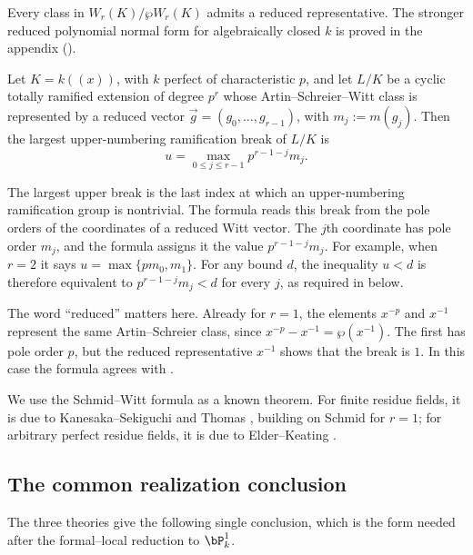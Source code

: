 Every class in $W_r(K)/\wp W_r(K)$ admits a reduced representative.
The stronger reduced polynomial normal form for algebraically closed $k$ is
proved in the appendix ().

\begin{theorem}
\label{theorem:schmid_witt_break_formula}
Let $K=k((x))$, with $k$ perfect of characteristic $p$, and let $L/K$ be a
cyclic totally ramified extension of degree $p^r$ whose
Artin--Schreier--Witt class is represented by a reduced vector
$\vec g=(g_0,\dots,g_{r-1})$, with $m_j:=m(g_j)$. Then the largest
upper-numbering ramification break of $L/K$ is
\[
u=\max_{0\leq j\leq r-1}p^{r-1-j}m_j.
\]
\end{theorem}

The largest upper break is the last index at which an upper-numbering
ramification group is nontrivial. The formula reads this break from the pole
orders of the coordinates of a reduced Witt vector. The $j$th coordinate has
pole order $m_j$, and the formula assigns it the value $p^{r-1-j}m_j$.
For example, when $r=2$ it says $u=\max\{pm_0,m_1\}$. For any bound
$d$, the inequality $u<d$ is therefore equivalent to
$p^{r-1-j}m_j<d$ for every $j$, as required in
 below.

The word ``reduced'' matters here. Already for $r=1$, the elements
$x^{-p}$ and $x^{-1}$ represent the same Artin--Schreier class, since
$x^{-p}-x^{-1}=\wp(x^{-1})$. The first has pole order $p$, but the reduced
representative $x^{-1}$ shows that the break is $1$. In this case the formula
agrees with .

We use the Schmid--Witt formula as a known theorem. For finite residue
fields, it is due to Kanesaka--Sekiguchi \cite{KanesakaSekiguchi1979} and
Thomas \cite{Thomas2005}, building on Schmid \cite{Schmid1937} for $r=1$;
for arbitrary perfect residue fields, it is due to Elder--Keating
\cite{ElderKeating2025}.

\subsection*{The common realization conclusion}

The three theories give the following single conclusion, which is the form
needed after the formal--local reduction to $\bP^1_k$.

